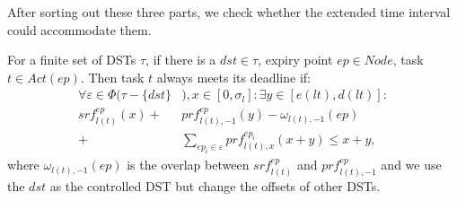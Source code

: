 \documentclass[sigconf]{acmart}
\begin{document}
After sorting out these three parts, we check whether the extended time interval could accommodate them. 




\begin{theorem}
  For a finite set of DSTs $\tau$, if there is a $dst\in\tau$, expiry point $ep\in Node$, task $t\in Act(ep)$. Then task $t$ always meets its deadline if:
   \begin{equation}\begin{split}
      \forall \varepsilon\in\Phi(\tau-\{dst\}&),x\in[0,\sigma_l]:\exists y\in[e(lt),d(lt)]:\\
      srf^{ep}_{l(t)}(x)+&prf^{ep}_{l(t),-1}(y)-\omega_{l(t),-1}(ep)\\
      +&\sum\limits_{ep_i\in \varepsilon}prf^{ep_i}_{l(t),x}(x+y)\leq x+y,
    \end{split}\label{theorem_verification}\end{equation}
    where $\omega_{l(t),-1}(ep)$ is the overlap between $srf^{ep}_{l(t)}$ and $prf^{ep}_{l(t),-1}$ and we use the $dst$ as the controlled DST but change the offsets of other DSTs.
\end{theorem}
\end{document}

